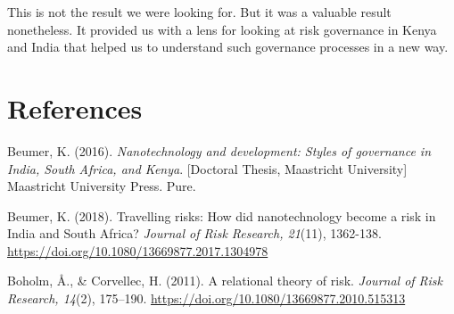 \documentclass[authordate, anecdote]{jote-new-article}
\begin{document}
	This is not the result we were looking for. But it was a valuable result nonetheless. It provided us with a lens for looking at risk governance in Kenya and India that helped us to understand such governance processes in a new way.






	\section{References}



	Beumer, K. (2016). \emph{Nanotechnology and development: Styles of governance in India, South Africa, and Kenya}. [Doctoral Thesis, Maastricht University] Maastricht University Press. Pure.



	Beumer, K. (2018). Travelling risks: How did nanotechnology become a risk in India and South Africa? \emph{Journal of Risk Research, 21}(11), 1362-138. \url{https://doi.org/10.1080/13669877.2017.1304978}



	Boholm, Å., \& Corvellec, H. (2011). A relational theory of risk. \emph{Journal of Risk Research, 14}(2), 175--190. \url{https://doi.org/10.1080/13669877.2010.515313}
\end{document}
